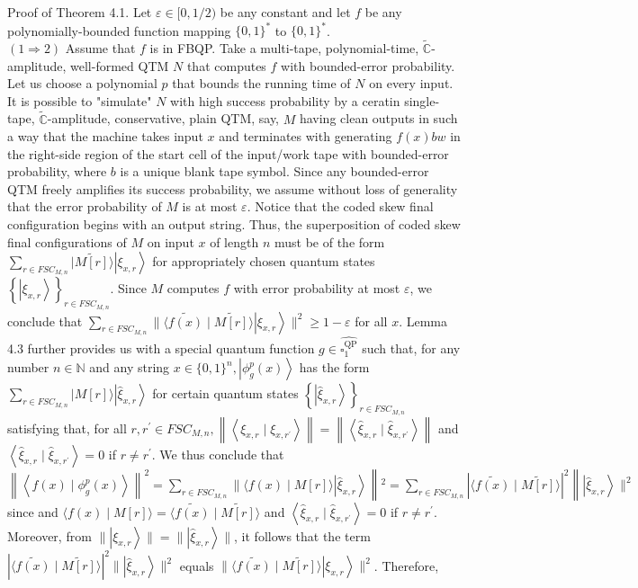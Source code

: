 \documentclass[10pt]{article}
\begin{document}
Proof of Theorem 4.1. Let $\varepsilon \in[0,1 / 2)$ be any constant and let $f$ be any polynomially-bounded function mapping $\{0,1\}^{*}$ to $\{0,1\}^{*}$.\\
$(1 \Rightarrow 2)$ Assume that $f$ is in FBQP. Take a multi-tape, polynomial-time, $\tilde{\mathbb{C}}$-amplitude, well-formed QTM $N$ that computes $f$ with bounded-error probability. Let us choose a polynomial $p$ that bounds the running time of $N$ on every input. It is possible to "simulate" $N$ with high success probability by a ceratin single-tape, $\tilde{\mathbb{C}}$-amplitude, conservative, plain QTM, say, $M$ having clean outputs in such a way that the machine takes input $x$ and terminates with generating $f(x) b w$ in the right-side region of the start cell of the input/work tape with bounded-error probability, where $b$ is a unique blank tape symbol. Since any bounded-error QTM freely amplifies its success probability, we assume without loss of generality that the error probability of $M$ is at most $\varepsilon$. Notice that the coded skew final configuration begins with an output string. Thus, the superposition of coded skew final configurations of $M$ on input $x$ of length $n$ must be of the form $\sum_{r \in F S C_{M, n}}|\widetilde{M[r]}\rangle\left|\xi_{x, r}\right\rangle$ for appropriately chosen quantum states $\left\{\left|\xi_{x, r}\right\rangle\right\}_{r \in F S C_{M, n}}$. Since $M$ computes $f$ with error probability at most $\varepsilon$, we conclude that $\sum_{r \in F S C_{M, n}} \|\langle\widetilde{f(x)} \mid \widetilde{M[r]}\rangle\left|\xi_{x, r}\right\rangle \|^{2} \geq 1-\varepsilon$ for all $x$. Lemma 4.3 further provides us with a special quantum function $g \in \widehat{\square_{1}^{\mathrm{QP}}}$ such that, for any number $n \in \mathbb{N}$ and any string $x \in\{0,1\}^{n},\left|\phi_{g}^{p}(x)\right\rangle$ has the form $\sum_{r \in F S C_{M, n}}|M[r]\rangle\left|\widehat{\xi}_{x, r}\right\rangle$ for certain quantum states $\left\{\left|\widehat{\xi}_{x, r}\right\rangle\right\}_{r \in F S C_{M, n}}$ satisfying that, for all $r, r^{\prime} \in F S C_{M, n},\left\|\left\langle\xi_{x, r} \mid \xi_{x, r^{\prime}}\right\rangle\right\|=\left\|\left\langle\widehat{\xi}_{x, r} \mid \widehat{\xi}_{x, r^{\prime}}\right\rangle\right\|$ and $\left\langle\widehat{\xi}_{x, r} \mid \widehat{\xi}_{x, r^{\prime}}\right\rangle=0$ if $r \neq r^{\prime}$. We thus conclude that $\left\|\left\langle f(x) \mid \phi_{g}^{p}(x)\right\rangle\right\|^{2}=\sum_{r \in F S C_{M, n}} \|\langle f(x) \mid M[r]\rangle\left|\widehat{\xi}_{x, r}\right\rangle\left\|^{2}=\sum_{r \in F S C_{M, n}}|\langle\widetilde{f(x)} \mid \widetilde{M[r]}\rangle|^{2}\right\|\left|\widehat{\xi}_{x, r}\right\rangle \|^{2}$ since and $\langle f(x) \mid M[r]\rangle=\langle\widetilde{f(x)} \mid \widetilde{M[r]}\rangle$ and $\left\langle\widehat{\xi}_{x, r} \mid \widehat{\xi}_{x, r^{\prime}}\right\rangle=0$ if $r \neq r^{\prime}$. Moreover, from $\|\left|\xi_{x, r}\right\rangle\|=\|\left|\widehat{\xi}_{x, r}\right\rangle \|$, it follows that the term $|\langle\widetilde{f(x)} \mid \widetilde{M[r]}\rangle|^{2} \|\left|\widehat{\xi}_{x, r}\right\rangle \|^{2}$ equals $\|\langle\widetilde{f(x)} \mid \widetilde{M[r]}\rangle\left|\xi_{x, r}\right\rangle \|^{2}$. Therefore, 
\end{document}
